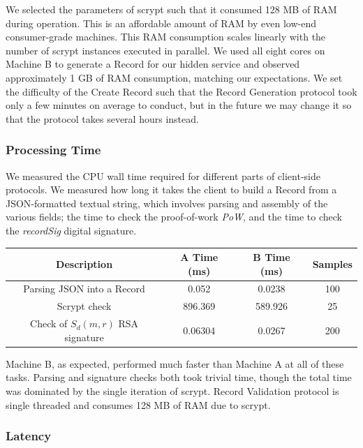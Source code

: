 \documentclass{sig-alternate}
\begin{document}
We selected the parameters of scrypt such that it consumed 128 MB of RAM during operation. This is an affordable amount of RAM by even low-end consumer-grade machines. This RAM consumption scales linearly with the number of scrypt instances executed in parallel. We used all eight cores on Machine B to generate a Record for our hidden service and observed approximately 1 GB of RAM consumption, matching our expectations. We set the difficulty of the Create Record such that the Record Generation protocol took only a few minutes on average to conduct, but in the future we may change it so that the protocol takes several hours instead.

\subsubsection{Processing Time}

We measured the CPU wall time required for different parts of client-side protocols. We measured how long it takes the client to build a Record from a JSON-formatted textual string, which involves parsing and assembly of the various fields; the time to check the proof-of-work \emph{PoW}, and the time to check the \emph{recordSig} digital signature.

\renewcommand{\arraystretch}{1}
\begin{center}
    \begin{tabular}{ | c | c | c | c |}
    \hline
    \textbf{Description} & \textbf{A Time (ms)} & \textbf{B Time (ms)} & \textbf{Samples} \\
    \hline
    Parsing JSON into a Record & 0.052 & 0.0238 & 100 \\ \hline
	Scrypt check & 896.369 & 589.926 & 25 \\ \hline
	Check of $ S_{d}(m, r) $ RSA signature & 0.06304 & 0.0267 & 200 \\
	\hline
    \end{tabular}
\end{center}

Machine B, as expected, performed much faster than Machine A at all of these tasks. Parsing and signature checks both took trivial time, though the total time was dominated by the single iteration of scrypt. Record Validation protocol is single threaded and consumes 128 MB of RAM due to scrypt.

\subsubsection{Latency}
\end{document}
